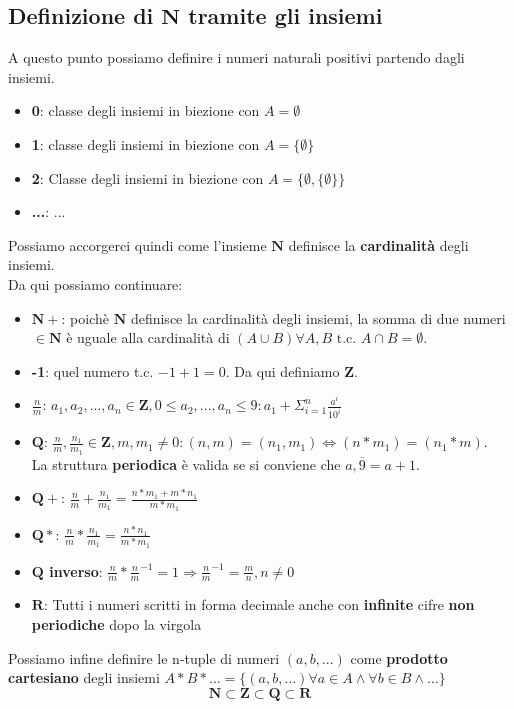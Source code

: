 \documentclass{report}
\begin{document}
    \subsection{Definizione di $\mathbf{N}$ tramite gli insiemi}
    A questo punto possiamo definire i numeri naturali positivi partendo dagli insiemi.
    \begin{itemize}
        \item \textbf{0}: classe degli insiemi in biezione con $A = \emptyset$
        \item \textbf{1}: classe degli insiemi in biezione con $A = \{\emptyset\}$
        \item \textbf{2}: Classe degli insiemi in biezione con $A = \{\emptyset, \{\emptyset\}\}$
        \item \textbf{...}: ...
    \end{itemize}
    Possiamo accorgerci quindi come l'insieme $\mathbf{N}$ definisce la \textbf{cardinalità}
    degli insiemi. \\
    Da qui possiamo continuare:
    \begin{itemize}
        \item \textbf{$\mathbf{N} +$}: poichè $\mathbf{N}$ definisce la cardinalità degli insiemi,
            la somma di due numeri $\in \mathbf{N}$ è uguale alla cardinalità di 
            $(A \cup B) \forall A, B \textrm{ t.c. } A \cap B = \emptyset$.
        \item \textbf{-1}: quel numero t.c. $-1 + 1 = 0$. Da qui definiamo $\mathbf{Z}$.
        \item \textbf{$\frac{n}{m}$}: 
            $a_1, a_2, ..., a_n \in \mathbf{Z}, 0 \leq a_2, ..., a_n \leq 9:
            a_1 + \Sigma_{i=1}^{n}\frac{a^i}{10^i}$
        \item \textbf{$\mathbf{Q}$}: 
            ${\frac{n}{m},\frac{n_1}{m_1} \in \mathbf{Z}, m, m_1 \neq 0: 
            (n, m) = (n_1, m_1) \Longleftrightarrow (n * m_1) = (n_1 * m)}$. \\
            La struttura \textbf{periodica} è valida se si conviene che 
            $a,\overline{9} = a + 1$.
        \item \textbf{$\mathbf{Q} +$}: 
            $\frac{n}{m} + \frac{n_1}{m_1} = \frac{n * m_1 + m * n_1}{m * m_1}$
        \item \textbf{$\mathbf{Q} *$}:
            $\frac{n}{m} * \frac{n_1}{m_1} = \frac{n * n_1}{m * m_1}$
        \item \textbf{$\mathbf{Q}$ inverso}: 
            $\frac{n}{m} * \frac{n}{m}^{-1} = 1 \Longrightarrow 
            \frac{n}{m}^{-1} = \frac{m}{n}, n \neq 0$
        \item \textbf{$\mathbf{R}$}: {Tutti i numeri scritti in forma decimale
            anche con \textbf{infinite} cifre \textbf{non periodiche} dopo la virgola}
    \end{itemize}
    Possiamo infine definire le n-tuple di numeri $\left(a, b, ...\right)$ come
    \textbf{prodotto cartesiano} degli insiemi $A * B * ... = \{(a, b, ...) 
    \forall a \in A \wedge \forall b \in B \wedge ...\}$
    $$\mathbf{N} \subset \mathbf{Z} \subset \mathbf{Q} \subset \mathbf{R}$$
\end{document}
